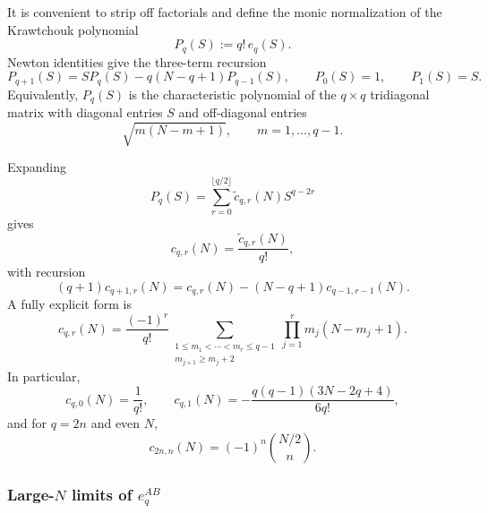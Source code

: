 \documentclass{article}
\theoremstyle{definition}
\begin{document}
It is convenient to strip off factorials and define the monic
normalization of the Krawtchouk polynomial
\begin{equation}
    P_q(S)
    :=
    q!\,e_q(S).
\end{equation}
Newton identities give the three-term recursion
\begin{equation}
    P_{q+1}(S)
    =
    SP_q(S)
    -
    q(N-q+1)P_{q-1}(S),
    \qquad
    P_0(S)=1,
    \qquad
    P_1(S)=S.
    \label{eq:krawtchouk_recursion}
\end{equation}
Equivalently, $P_q(S)$ is the characteristic polynomial of the
$q\times q$ tridiagonal matrix with diagonal entries $S$ and off-diagonal
entries
\begin{equation}
    \sqrt{m(N-m+1)},
    \qquad
    m=1,\ldots,q-1.
\end{equation}

Expanding
\begin{equation}
    P_q(S)
    =
    \sum_{r=0}^{\lfloor q/2\rfloor}
    \widetilde c_{q,r}(N)S^{q-2r}
\end{equation}
gives
\begin{equation}
    c_{q,r}(N)
    =
    \frac{\widetilde c_{q,r}(N)}{q!},
\end{equation}
with recursion
\begin{equation}
    (q+1)c_{q+1,r}(N)
    =
    c_{q,r}(N)
    -
    (N-q+1)c_{q-1,r-1}(N).
    \label{eq:cqr_recursion}
\end{equation}
A fully explicit form is
\begin{equation}
    c_{q,r}(N)
    =
    \frac{(-1)^r}{q!}
    \sum_{\substack{
       1\leq m_1<\cdots<m_r\leq q-1\\
       m_{j+1}\geq m_j+2
    }}
    \prod_{j=1}^r
    m_j(N-m_j+1).
    \label{eq:cqr_matching}
\end{equation}
In particular,
\begin{equation}
    c_{q,0}(N)=\frac1{q!},
    \qquad
    c_{q,1}(N)
    =
    -
    \frac{
       q(q-1)(3N-2q+4)
    }{
       6q!
    },
\end{equation}
and for $q=2n$ and even $N$,
\begin{equation}
    c_{2n,n}(N)
    =
    (-1)^n
    \binom{N/2}{n}.
\end{equation}


\subsubsection{Large-$N$ limits of $e_q^{AB}$}
\end{document}
